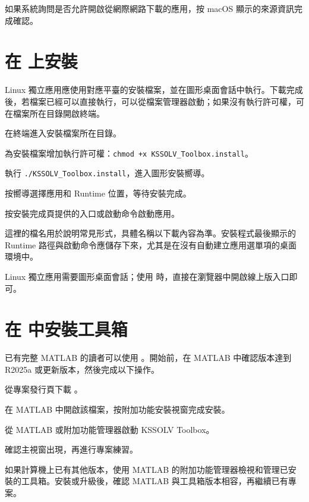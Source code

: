如果系統詢問是否允許開啟從網際網路下載的應用，按 macOS 顯示的來源資訊完成確認。

\section{在  上安裝}

Linux 獨立應用應使用對應平臺的安裝檔案，並在圖形桌面會話中執行。下載完成後，若檔案已經可以直接執行，可以從檔案管理器啟動；如果沒有執行許可權，可在檔案所在目錄開啟終端。

\begin{steps}
\item 在終端進入安裝檔案所在目錄。
\item 為安裝檔案增加執行許可權：\texttt{chmod +x KSSOLV\_Toolbox.install}。
\item 執行 \texttt{./KSSOLV\_Toolbox.install}，進入圖形安裝嚮導。
\item 按嚮導選擇應用和 Runtime 位置，等待安裝完成。
\item 按安裝完成頁提供的入口或啟動命令啟動應用。
\end{steps}

這裡的檔名用於說明常見形式，具體名稱以下載內容為準。安裝程式最後顯示的 Runtime 路徑與啟動命令應儲存下來，尤其是在沒有自動建立應用選單項的桌面環境中。

Linux 獨立應用需要圖形桌面會話；使用 \ksonline{} 時，直接在瀏覽器中開啟線上版入口即可。


\section{在 \regmark{} 中安裝工具箱}

已有完整 MATLAB\regmark{} 的讀者可以使用 。開始前，在 MATLAB\regmark{} 中確認版本達到 R2025a 或更新版本，然後完成以下操作。

\begin{steps}
\item 從專案發行頁下載 。
\item 在 MATLAB\regmark{} 中開啟該檔案，按附加功能安裝視窗完成安裝。
\item 從 MATLAB\regmark{} 或附加功能管理器啟動 KSSOLV Toolbox。
\item 確認主視窗出現，再進行專案練習。
\end{steps}

如果計算機上已有其他版本，使用 MATLAB\regmark{} 的附加功能管理器檢視和管理已安裝的工具箱。安裝或升級後，確認 MATLAB\regmark{} 與工具箱版本相容，再繼續已有專案。

